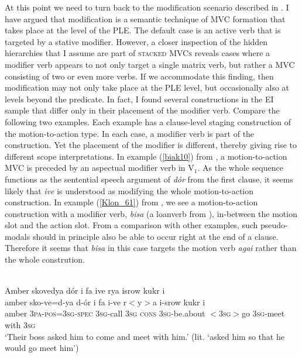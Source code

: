 At this point we need to turn back to the modification scenario described in . I have argued that modification is a semantic technique of MVC formation that takes place at the level of the PLE. The default case is an active verb that is targeted by a stative modifier. However, a closer inspection of the hidden hierarchies that I assume are part of \textsc{stacked MVCs} reveals cases where a modifier verb appears to not only target a single matrix verb, but rather a MVC consisting of two or even more verbs. If we accommodate this finding, then modification may not only take place at the PLE level, but occasionally also at levels beyond the predicate. In fact, I found several constructions in the EI sample that differ only in their placement of the modifier verb. Compare the following two examples. Each example has a clause-level staging construction of the motion-to-action type. In each case, a modifier verb is part of the construction. Yet the placement of the modifier is different, thereby giving rise to different scope interpretations. In example (\ref{biak10}) from , a motion-to-action MVC is preceded by an aspectual modifier verb in V$_1$. As the whole sequence functions as the sentential speech argument of \textit{dór} from the first clause, it seems likely that \textit{ive} is understood as modifying the whole motion-to-action construction. In example (\ref{Klon_61}) from , we see a motion-to-action construction with a modifier verb, \textit{bisa} (a loanverb from ), in-between the motion slot and the action slot. From a comparison with other  examples, such pseudo-modals should in principle also be able to occur right at the end of a clause. Therefore it seems that \textit{bisa} in this case targets the motion verb \textit{agai} rather than the whole constrution.

\ea \label{biak10}
\\
\glll Amber skovedya dór i fa ive rya isrow kukr i \\
amber sko-ve=d-ya d-ór i fa i-ve r$<$y$>$a i-srow kukr i \\
amber 3\textsc{pa}-\textsc{pos}=3\textsc{sg}-\textsc{spec} 3\textsc{sg}-call 3\textsc{sg} \textsc{cons} 3\textsc{sg}-be.about $<$3\textsc{sg}$>$go 3\textsc{sg}-meet with 3\textsc{sg}\\
\glft `Their boss asked him to come and meet with him.' (lit. `asked him so that he
would go meet him') \\ 
\z

